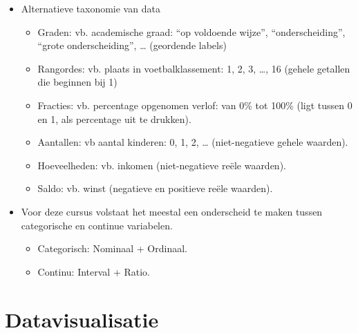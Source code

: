 \documentclass[]{memoir}
\providecommand{\tightlist}{%
  \setlength{\itemsep}{0pt}\setlength{\parskip}{0pt}}
\begin{document}
\begin{itemize}
\tightlist
\item
  Alternatieve taxonomie van data

  \begin{itemize}
  \tightlist
  \item
    Graden: vb. academische graad: ``op voldoende wijze'',
    ``onderscheiding'', ``grote onderscheiding'', \ldots{} (geordende
    labels)
  \item
    Rangordes: vb. plaats in voetbalklassement: 1, 2, 3, \ldots{}, 16
    (gehele getallen die beginnen bij 1)
  \item
    Fracties: vb. percentage opgenomen verlof: van 0\% tot 100\% (ligt
    tussen 0 en 1, als percentage uit te drukken).
  \item
    Aantallen: vb aantal kinderen: 0, 1, 2, \ldots{} (niet-negatieve
    gehele waarden).
  \item
    Hoeveelheden: vb. inkomen (niet-negatieve reële waarden).
  \item
    Saldo: vb. winst (negatieve en positieve reële waarden).
  \end{itemize}
\item
  Voor deze cursus volstaat het meestal een onderscheid te maken tussen
  categorische en continue variabelen.

  \begin{itemize}
  \tightlist
  \item
    Categorisch: Nominaal + Ordinaal.
  \item
    Continu: Interval + Ratio.
  \end{itemize}
\end{itemize}

\section{Datavisualisatie}\label{datavisualisatie}
\end{document}
